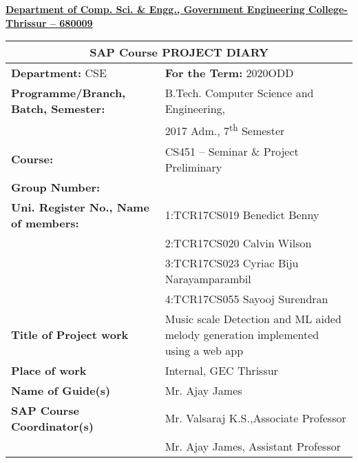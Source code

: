 \documentclass[12pt,a4paper]{article}
\renewcommand{\arraystretch}{1.3}
\begin{document}
\begin{center}
	\textbf{
		\underline {Department of Comp. Sci. \& Engg., Government 
Engineering College-Thrissur -- 680009}
	}
\end{center}



\begin{center}

\begin{tabularx}{1\textwidth}{|X|X|}
	\hline
	\hline
	\multicolumn{2}{|c|}{\textbf{SAP Course PROJECT DIARY}}\\
	\hline
	\textbf{Department:} CSE & \textbf{For the Term:} 2020ODD\\
	\hline
	\textbf{Programme/Branch, Batch, Semester:} & B.Tech. Computer 
Science and Engineering,\\ & 2017 Adm., 
7\textsuperscript{th} Semester\\
	\hline
	\textbf{Course:} & CS451 – Seminar \& Project Preliminary\\	
	\hline
	\textbf{Group Number:} &  \\
	\hline
        \textbf{Uni. Register No., Name of members:} & 1:TCR17CS019 Benedict Benny\\ & 2:TCR17CS020 Calvin Wilson\\ & 
3:TCR17CS023 Cyriac Biju Narayamparambil \\ & 4:TCR17CS055 Sayooj Surendran\\
	\hline
	\textbf{Title of Project work} &  Music scale Detection and ML aided melody generation implemented using a web app\\[30pt]
	\hline
	\textbf{Place of work} & Internal, GEC Thrissur\\
	\hline
	\textbf{Name of Guide(s)} & Mr. Ajay James\\
	\hline
	\textbf{SAP Course Coordinator(s)} & Mr. Valsaraj K.S.,Associate 
Professor\\ & Mr. Ajay James, Assistant Professor\\
        \hline
        \hline
\end{tabularx}



\renewcommand{\arraystretch}{1.3}


\end{center}
\end{document}
